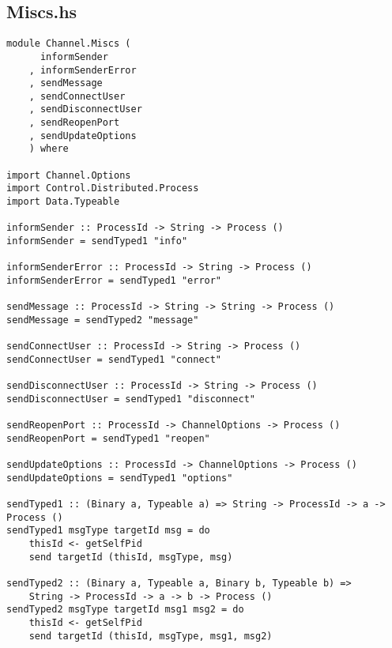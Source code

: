 \documentclass[russian,utf8,simple,emptystyle]{eskdtext}
\begin{document}
\subsection{Miscs.hs}
\begin{lstlisting}
module Channel.Miscs (
      informSender
    , informSenderError
    , sendMessage
    , sendConnectUser
    , sendDisconnectUser
    , sendReopenPort
    , sendUpdateOptions
    ) where

import Channel.Options
import Control.Distributed.Process 
import Data.Typeable

informSender :: ProcessId -> String -> Process ()
informSender = sendTyped1 "info"

informSenderError :: ProcessId -> String -> Process ()
informSenderError = sendTyped1 "error"

sendMessage :: ProcessId -> String -> String -> Process ()
sendMessage = sendTyped2 "message"

sendConnectUser :: ProcessId -> String -> Process ()
sendConnectUser = sendTyped1 "connect"

sendDisconnectUser :: ProcessId -> String -> Process ()
sendDisconnectUser = sendTyped1 "disconnect"

sendReopenPort :: ProcessId -> ChannelOptions -> Process ()
sendReopenPort = sendTyped1 "reopen"

sendUpdateOptions :: ProcessId -> ChannelOptions -> Process ()
sendUpdateOptions = sendTyped1 "options"

sendTyped1 :: (Binary a, Typeable a) => String -> ProcessId -> a -> Process ()
sendTyped1 msgType targetId msg = do 
    thisId <- getSelfPid
    send targetId (thisId, msgType, msg)

sendTyped2 :: (Binary a, Typeable a, Binary b, Typeable b) => 
    String -> ProcessId -> a -> b -> Process ()
sendTyped2 msgType targetId msg1 msg2 = do 
    thisId <- getSelfPid
    send targetId (thisId, msgType, msg1, msg2)
\end{lstlisting}
\end{document}
